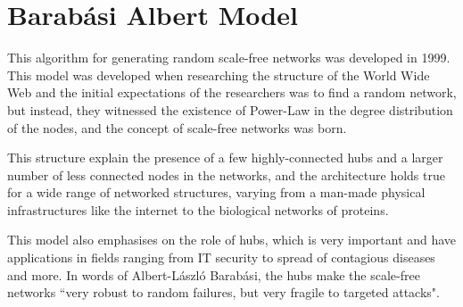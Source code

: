 
\chapter{Barab\'asi Albert Model} %

\label{AppendixB} %


This algorithm for generating random scale-free networks was developed in 1999.
This model was developed when researching the structure of the World Wide Web and the initial expectations of the researchers was to find a random network, but instead, they witnessed the existence of Power-Law in the degree distribution of the nodes, and the concept of scale-free networks was born.

This structure explain the presence of a few highly-connected hubs and a larger number of less connected nodes in the networks, and the architecture holds true for a wide range of networked structures, varying from a man-made physical infrastructures like the internet to the biological networks of proteins.

This model also emphasises on the role of hubs, which is very important and have applications in fields ranging from IT security to spread of contagious diseases and more. In words of Albert-L\'aszl\'o Barab\'asi, the hubs make the scale-free networks ``very robust to random failures, but very fragile to targeted attacks". 

